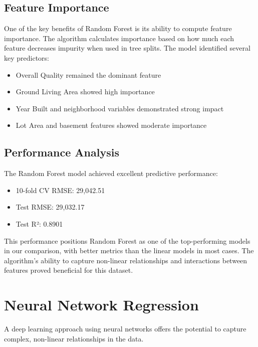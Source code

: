 \subsection{Feature Importance}
One of the key benefits of Random Forest is its ability to compute feature importance. The algorithm calculates importance based on how much each feature decreases impurity when used in tree splits. The model identified several key predictors:

\begin{itemize}
    \item Overall Quality remained the dominant feature
    \item Ground Living Area showed high importance
    \item Year Built and neighborhood variables demonstrated strong impact
    \item Lot Area and basement features showed moderate importance
\end{itemize}

\subsection{Performance Analysis}
The Random Forest model achieved excellent predictive performance:
\begin{itemize}
    \item 10-fold CV RMSE: 29,042.51
    \item Test RMSE: 29,032.17
    \item Test R²: 0.8901
\end{itemize}

This performance positions Random Forest as one of the top-performing models in our comparison, with better metrics than the linear models in most cases. The algorithm's ability to capture non-linear relationships and interactions between features proved beneficial for this dataset.

\section{Neural Network Regression}
A deep learning approach using neural networks offers the potential to capture complex, non-linear relationships in the data.

